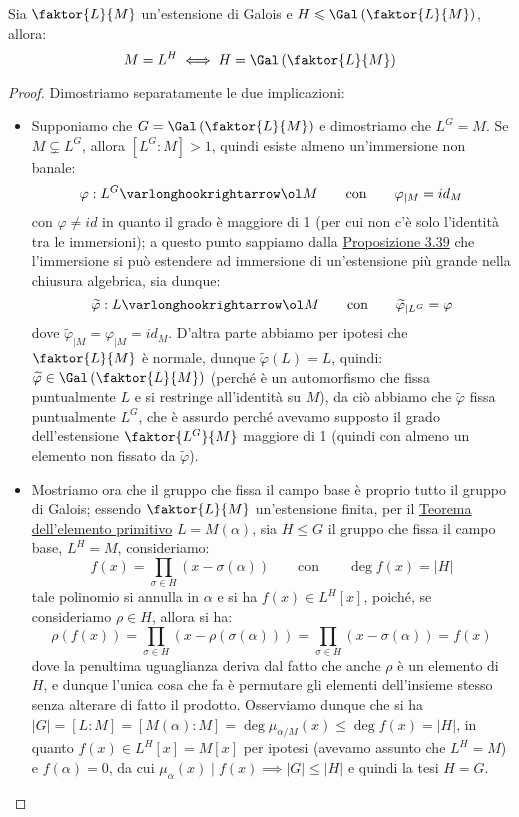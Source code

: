 \documentclass[11pt]{scrartcl}
\begin{document}
\begin{lemma}
    \label{3.66}
    Sia $\faktor{L}{M}$ un'estensione di Galois e $H \leqslant \Gal\left(\faktor{L}{M}\right)$, allora:
    \[ M = L^H \iff H = \Gal\left(\faktor{L}{M}\right)
        \]
\end{lemma}

\begin{proof}
    Dimostriamo separatamente le due implicazioni:
    \begin{itemize}
        \item Supponiamo che $G = \Gal\left(\faktor{L}{M}\right)$ e dimostriamo che $L^G = M$. Se $M \subsetneq L^G$, allora $[L^G : M]>1$, quindi esiste almeno un'immersione non banale:
        \[ \varphi : L^G \varlonghookrightarrow \ol M \qquad \text{con} \qquad \varphi_{|M} = id_M
            \]
        con $\varphi \ne id$ in quanto il grado è maggiore di 1 (per cui non c'è solo l'identità tra le immersioni); a questo punto sappiamo dalla \hyperref[3.39]{Proposizione 3.39} che l'immersione si può estendere ad 
        immersione di un'estensione più grande nella chiusura algebrica, sia dunque:
        \[ \widetilde{\varphi} : L \varlonghookrightarrow \ol M \qquad \text{con} \qquad \widetilde{\varphi}_{|L^G} = \varphi
            \]
        dove $\widetilde{\varphi}_{|M} = \varphi_{|M} = id_M$. D'altra parte abbiamo per ipotesi che $\faktor{L}{M}$ è normale, dunque $\widetilde{\varphi}(L) = L$, quindi:
        $\widetilde{\varphi} \in \Gal\left(\faktor{L}{M}\right)$ (perché è un automorfismo che fissa puntualmente $L$ e si restringe all'identità su $M$), da ciò abbiamo che $\widetilde{\varphi}$ fissa puntualmente
        $L^G$, che è assurdo perché avevamo supposto il grado dell'estensione $\faktor{L^G}{M}$ maggiore di 1 (quindi con almeno un elemento non fissato da $\widetilde{\varphi}$).
        \item Mostriamo ora che il gruppo che fissa il campo base è proprio tutto il gruppo di Galois; essendo $\faktor{L}{M}$ un'estensione finita, per il \hyperref[prim]{Teorema dell'elemento primitivo} $L = M(\alpha)$, sia $H \leqslant G$ il gruppo che fissa il campo base, $L^H = M$, consideriamo:
        \[ f(x) = \prod_{\sigma \in H}(x - \sigma(\alpha)) \qquad \text{con} \qquad \deg f(x) = |H|
            \]
        tale polinomio si annulla in $\alpha$ e si ha $f(x) \in L^H[x]$, poiché, se consideriamo $\rho \in H$, allora si ha:
        \[ \rho (f(x)) = \prod_{\sigma \in H}(x - \rho(\sigma(\alpha))) = \prod_{\sigma \in H}(x - \sigma(\alpha)) = f(x)
            \]
        dove la penultima uguaglianza deriva dal fatto che anche $\rho$ è un elemento di $H$, e dunque l'unica cosa che fa è permutare gli elementi dell'insieme stesso senza alterare di fatto il prodotto.
        Osserviamo dunque che si ha $|G| = [L : M] = [M(\alpha) : M] = \deg \mu_{\alpha/M}(x) \leq \deg f(x) = |H|$, in quanto $f(x) \in L^H[x] = M[x]$ per ipotesi (avevamo assunto che $L^H = M$) e $f(\alpha) = 0$, da cui $\mu_\alpha(x) \mid f(x) \implies |G| \leq |H|$ e quindi la tesi $H = G$.
    \end{itemize}
\end{proof}
\end{document}
